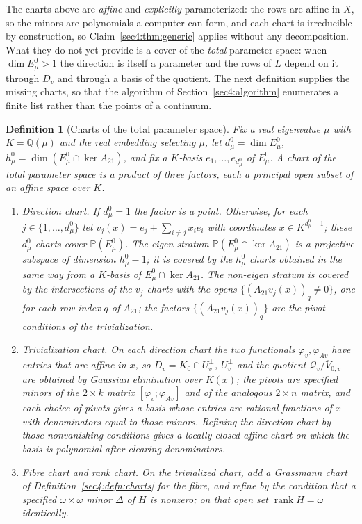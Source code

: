 \documentclass[journal]{IEEEtran}
\theoremstyle{plainn}
\newtheorem{defn}{Definition}
\theoremstyle{remark}
\newcommand{\rank}{\operatorname{rank}}
\begin{document}
The charts above are \emph{affine} and \emph{explicitly} parameterized: the rows are affine in $X$, so
the minors are polynomials a computer can form, and each chart is irreducible by construction, so
Claim~\ref{sec4:thm:generic} applies without any decomposition. What they do not yet provide is a
cover of the \emph{total} parameter space: when $\dim E_\mu^0>1$ the direction is itself a parameter and
the rows of $L$ depend on it through $D_v$ and through a basis of the quotient. The next definition
supplies the missing charts, so that the algorithm of Section~\ref{sec4:algorithm} enumerates a finite
list rather than the points of a continuum.

\begin{defn}[Charts of the total parameter space]
\label{sec4:defn:totcharts}
Fix a real eigenvalue $\mu$ with $K=\mathbb Q(\mu)$ and the real embedding selecting $\mu$, let
$d_\mu^0=\dim E_\mu^0$, $h_\mu^0=\dim(E_\mu^0\cap\ker A_{21})$, and fix a $K$-basis
$e_1,\dots,e_{d_\mu^0}$ of $E_\mu^0$. A chart of the total parameter space is a product of three
factors, each a principal open subset of an affine space over $K$.
\begin{enumerate}[label=(\roman*),leftmargin=*]
\item \emph{Direction chart.} If $d_\mu^0=1$ the factor is a point. Otherwise, for each
$j\in\{1,\dots,d_\mu^0\}$ let $v_j(x)=e_j+\sum_{i\ne j}x_i e_i$ with coordinates $x\in K^{d_\mu^0-1}$;
these $d_\mu^0$ charts cover $\mathbb P(E_\mu^0)$. The eigen stratum
$\mathbb P(E_\mu^0\cap\ker A_{21})$ is a projective subspace of dimension $h_\mu^0-1$; it is covered by
the $h_\mu^0$ charts obtained in the same way from a $K$-basis of $E_\mu^0\cap\ker A_{21}$. The non-eigen
stratum is covered by the intersections of the $v_j$-charts with the opens
$\{(A_{21}v_j(x))_q\ne0\}$, one for each row index $q$ of $A_{21}$; the factors
$\{(A_{21}v_j(x))_q\}$ are the pivot conditions of the trivialization.
\item \emph{Trivialization chart.} On each direction chart the two functionals $\varphi_v,\varphi_{Av}$
have entries that are affine in $x$, so $D_v=K_0\cap U_v^\perp$, $U_v^\perp$ and the quotient
$\mathcal Q_v/\overline V_{0,v}$ are obtained by Gaussian elimination over $K(x)$; the pivots are
specified minors of the $2\times k$ matrix $[\varphi_v;\varphi_{Av}]$ and of the analogous
$2\times n$ matrix, and each choice of pivots gives a basis whose entries are rational functions of $x$
with denominators equal to those minors. Refining the direction chart by those nonvanishing conditions
gives a locally closed affine chart on which the basis is polynomial after clearing denominators.
\item \emph{Fibre chart and rank chart.} On the trivialized chart, add a Grassmann chart of
Definition~\ref{sec4:defn:charts} for the fibre, and refine by the condition that a specified
$\omega\times\omega$ minor $\Delta$ of $H$ is nonzero; on that open set $\rank H=\omega$ identically.
\end{enumerate}
\end{defn}
\end{document}
